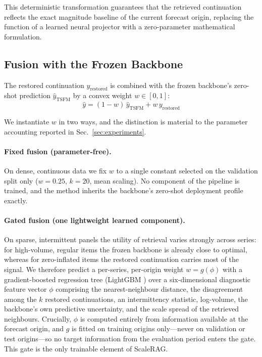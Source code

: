 \documentclass[twocolumn]{svjour3}          %
\begin{document}
This deterministic transformation guarantees that the retrieved continuation reflects the exact magnitude baseline of the current forecast origin, replacing the function of a learned neural projector with a zero-parameter mathematical formulation.

\subsection{Fusion with the Frozen Backbone}
\label{sec:fusion}
The restored continuation $y_{\text{restored}}$ is combined with the frozen backbone's zero-shot prediction $\hat{y}_{\text{TSFM}}$ by a convex weight $w \in [0,1]$:
\begin{equation}
\hat{y} = (1-w)\,\hat{y}_{\text{TSFM}} + w\,y_{\text{restored}}
\end{equation}

We instantiate $w$ in two ways, and the distinction is material to the parameter accounting reported in Sec.~\ref{sec:experiments}.

\paragraph{Fixed fusion (parameter-free).} On dense, continuous data we fix $w$ to a single constant selected on the validation split only ($w=0.25$, $k=20$, mean scaling). No component of the pipeline is trained, and the method inherits the backbone's zero-shot deployment profile exactly.

\paragraph{Gated fusion (one lightweight learned component).} On sparse, intermittent panels the utility of retrieval varies strongly across series: for high-volume, regular items the frozen backbone is already close to optimal, whereas for zero-inflated items the restored continuation carries most of the signal. We therefore predict a per-series, per-origin weight $w = g(\phi)$ with a gradient-boosted regression tree (LightGBM \cite{lightgbm}) over a six-dimensional diagnostic feature vector $\phi$ comprising the nearest-neighbour distance, the disagreement among the $k$ restored continuations, an intermittency statistic, log-volume, the backbone's own predictive uncertainty, and the scale spread of the retrieved neighbours. Crucially, $\phi$ is computed entirely from information available at the forecast origin, and $g$ is fitted on training origins only---never on validation or test origins---so no target information from the evaluation period enters the gate. This gate is the only trainable element of ScaleRAG.
\end{document}
